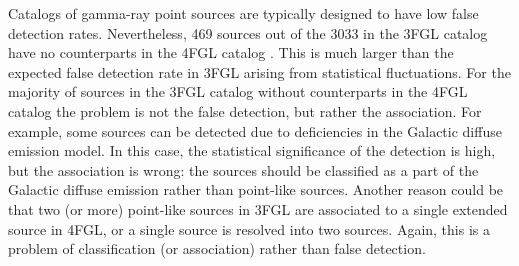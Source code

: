 Catalogs of gamma-ray point sources are typically designed to have low false detection rates. 
Nevertheless, 469 sources out of the 3033 in the 3FGL catalog \citep{2015ApJS..218...23A} have no counterparts 
in the 4FGL catalog \citep{2020ApJS..247...33A}.
This is much larger than the expected false detection rate in 3FGL arising from statistical fluctuations.
For the majority of sources in the 3FGL catalog without counterparts in the 4FGL catalog the problem is not the false detection, 
but rather the association.
For example, some sources can be detected due to deficiencies in the Galactic diffuse emission model.
In this case, the statistical significance of the detection is high, but the association is wrong: the sources should be classified as
a part of the Galactic diffuse emission rather than point-like sources.
Another reason could be that two (or more) point-like sources in 3FGL are associated to a single extended source in 4FGL,
or a single source is resolved into two sources.
Again, this is a problem of classification (or association) rather than false detection.

